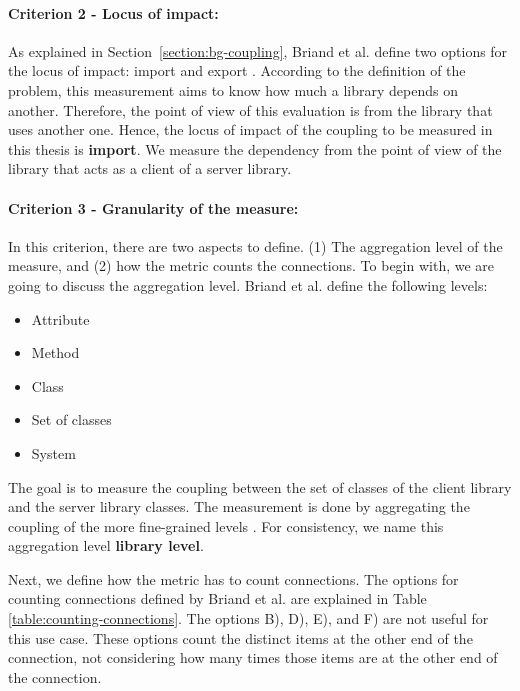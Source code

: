 \paragraph{Criterion 2 - Locus of impact:}
As explained in Section~\ref{section:bg-coupling}, Briand et al. define two options for the locus of impact: import and export \cite{briand1999unified}. According to the definition of the problem, this measurement aims to know how much a library depends on another. Therefore, the point of view of this evaluation is from the library that uses another one. Hence, the locus of impact of the coupling to be measured in this thesis is \textbf{import}. We measure the dependency from the point of view of the library that acts as a client of a server library.

\paragraph{Criterion 3 - Granularity of the measure:}
In this criterion, there are two aspects to define. (1) The aggregation level of the measure, and (2) how the metric counts the connections. To begin with, we are going to discuss the aggregation level. Briand et al. \cite{briand1999unified} define the following levels:

\begin{itemize}[noitemsep]
  \renewcommand\labelitemi{--}
  \item Attribute
  \item Method
  \item Class
  \item Set of classes
  \item System
\end{itemize}

\blankls
The goal is to measure the coupling between the set of classes of the client library and the server library classes. The measurement is done by aggregating the coupling of the more fine-grained levels \cite{briand1999unified}. For consistency, we name this aggregation level \textbf{library level}.

Next, we define how the metric has to count connections. The options for counting connections defined by Briand et al. \cite{briand1999unified} are explained in Table \ref{table:counting-connections}. The options B), D), E), and F) are not useful for this use case. These options count the distinct items at the other end of the connection, not considering how many times those items are at the other end of the connection.

